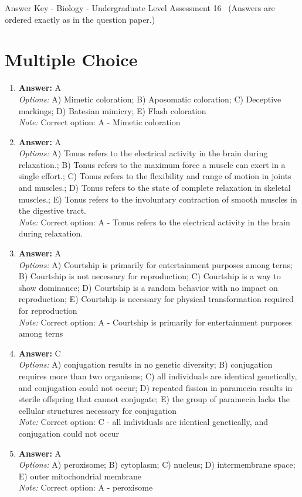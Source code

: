 \documentclass[12pt]{article}
\begin{document}
\begin{center}
Answer Key - Biology - Undergraduate Level Assessment 16 \
\small (Answers are ordered exactly as in the question paper.)
\end{center}

\section*{Multiple Choice}
\begin{enumerate}[label=\arabic*.]
\item \textbf{Answer:} A
\\ \textit{Options:} A) Mimetic coloration; B) Aposomatic coloration; C) Deceptive markings; D) Batesian mimicry; E) Flash coloration
\\ \textit{Note:} Correct option: A - Mimetic coloration
\item \textbf{Answer:} A
\\ \textit{Options:} A) Tonus refers to the electrical activity in the brain during relaxation.; B) Tonus refers to the maximum force a muscle can exert in a single effort.; C) Tonus refers to the flexibility and range of motion in joints and muscles.; D) Tonus refers to the state of complete relaxation in skeletal muscles.; E) Tonus refers to the involuntary contraction of smooth muscles in the digestive tract.
\\ \textit{Note:} Correct option: A - Tonus refers to the electrical activity in the brain during relaxation.
\item \textbf{Answer:} A
\\ \textit{Options:} A) Courtship is primarily for entertainment purposes among terns; B) Courtship is not necessary for reproduction; C) Courtship is a way to show dominance; D) Courtship is a random behavior with no impact on reproduction; E) Courtship is necessary for physical transformation required for reproduction
\\ \textit{Note:} Correct option: A - Courtship is primarily for entertainment purposes among terns
\item \textbf{Answer:} C
\\ \textit{Options:} A) conjugation results in no genetic diversity; B) conjugation requires more than two organisms; C) all individuals are identical genetically, and conjugation could not occur; D) repeated fission in paramecia results in sterile offspring that cannot conjugate; E) the group of paramecia lacks the cellular structures necessary for conjugation
\\ \textit{Note:} Correct option: C - all individuals are identical genetically, and conjugation could not occur
\item \textbf{Answer:} A
\\ \textit{Options:} A) peroxisome; B) cytoplasm; C) nucleus; D) intermembrane space; E) outer mitochondrial membrane
\\ \textit{Note:} Correct option: A - peroxisome
\end{enumerate}
\end{document}
